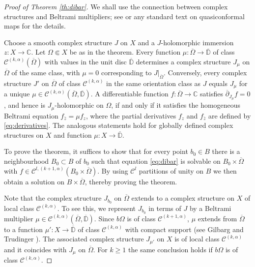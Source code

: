 \documentclass[10pt,a4paper]{amsart}
\newcommand\C{\mathbb{C}}
\newcommand\Cscr{\mathscr{C}}
\newcommand\D{\overline{\mathbb D}}
\newcommand\dibar{\overline\partial}
\begin{document}
\begin{proof}[Proof of Theorem \ref{th:dibar}]
We shall use the connection between complex
structures and Beltrami multipliers; see 
\cite[Sect.\ 2]{Forstneric2024Runge} or any 
standard text on quasiconformal maps for the details.

Choose a smooth complex structure $J$ on $X$ and 
a $J$-holomorphic immersion $z:X\to\C$.
Let $\Omega\Subset X$ be as in the theorem. 
Every function $\mu:\overline \Omega\to\D$ 
of class $\Cscr^{(k,\alpha)}(\overline \Omega)$  with values
in the unit disc $\D$ 
determines a complex structure $J_\mu$ on $\overline\Omega$ 
of the same class, with $\mu=0$ corresponding to $J|_{\overline\Omega}$. 
Conversely, every complex structure $J'$ on $\overline \Omega$
of class $\Cscr^{(k,\alpha)}$ in the same orientation class 
as $J$ equals $J_\mu$ for a unique 
$\mu\in \Cscr^{(k,\alpha)}(\overline \Omega,\D)$. 
A differentiable function $f:\overline\Omega\to\C$ satisfies 
$\dibar_{J_\mu}f=0$, and hence is $J_\mu$-holomorphic on
$\Omega$, if and only if it satisfies the homogeneous Beltrami equation 
$f_{\bar z} = \mu f_z$, where the partial derivatives $f_z$ and 
$f_{\bar z}$ are defined by \eqref{eq:derivatives}. The analogous
statements hold for globally defined complex structures on $X$
and function $\mu:X\to \D$.

To prove the theorem, it suffices to show that for every point $b_0\in B$ 
there is a neighbourhood $B_0\subset B$ of $b_0$ such that 
equation \eqref{eq:dibar} is solvable on $B_0\times \overline\Omega$ with 
$f\in \Cscr^{l,(k+1,\alpha)}(B_0\times \overline\Omega)$. 
By using $\Cscr^l$ partitions of unity on $B$ we then obtain 
a solution on $B\times \overline \Omega$, thereby proving the theorem.

Note that the complex structure $J_{b_0}$ on $\overline\Omega$
extends to a complex structure on $X$ of local class $\Cscr^{(k,\alpha)}$.
To see this, we represent 
$J_{b_0}$ in terms of $J$ by a Beltrami multiplier 
$\mu\in \Cscr^{(k,\alpha)}(\overline \Omega,\D)$. 
Since $b\Omega$ is of class $\Cscr^{(k+1,\alpha)}$,
$\mu$ extends from $\overline \Omega$ to a function
$\mu':X\to \D$ of class $\Cscr^{(k,\alpha)}$ 
with compact support 
(see Gilbarg and Trudinger \cite[Lemma 6.37]{GilbargTrudinger1983}). 
The associated complex structure $J_{\mu'}$ on $X$ is of local 
class $\Cscr^{(k,\alpha)}$ and it coincides with $J_\mu$ on 
$\overline \Omega$. For $k\ge 1$ the same conclusion 
holds if $b\Omega$ is of class $\Cscr^{(k,\alpha)}$.


\end{proof}
\end{document}
